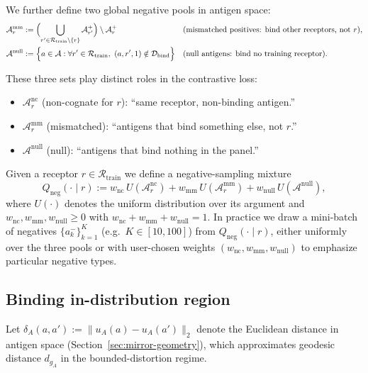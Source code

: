 \documentclass[11pt]{article}
\newcommand{\Dcal}{\mathcal{D}}
\newcommand{\Rcal}{\mathcal{R}}
\newcommand{\Acal}{\mathcal{A}}
\begin{document}
We further define two global negative pools in antigen space:
\begin{align*}
  \Acal_r^{\mathrm{mm}}
    &:= \Bigl( \bigcup_{r' \in \Rcal_{\mathrm{train}}\setminus\{r\}} \Acal_{r'}^+ \Bigr)
        \setminus \Acal_r^+ 
        &&\text{(mismatched positives: bind other receptors, not $r$)},\\
  \Acal^{\mathrm{null}}
    &:= \Bigl\{ a \in \Acal : \forall r' \in \Rcal_{\mathrm{train}},\ (a,r',1)\notin\Dcal_{\mathrm{bind}} \Bigr\}
        &&\text{(null antigens: bind no training receptor)}.
\end{align*}

These three sets play distinct roles in the contrastive loss:

\begin{itemize}
  \item $\Acal_r^{\mathrm{nc}}$ (non-cognate for $r$): “same receptor, non-binding antigen.”
  \item $\Acal_r^{\mathrm{mm}}$ (mismatched): “antigens that bind something else, not $r$.”
  \item $\Acal^{\mathrm{null}}$ (null): “antigens that bind nothing in the panel.”
\end{itemize}

Given a receptor $r\in\Rcal_{\mathrm{train}}$ we define a negative-sampling
mixture
\begin{equation}
  Q_{\mathrm{neg}}(\cdot \mid r)
    := w_{\mathrm{nc}}\, U(\Acal_r^{\mathrm{nc}})
     + w_{\mathrm{mm}}\, U(\Acal_r^{\mathrm{mm}})
     + w_{\mathrm{null}}\, U(\Acal^{\mathrm{null}}),
  \label{eq:Qneg}
\end{equation}
where $U(\cdot)$ denotes the uniform distribution over its argument and
$w_{\mathrm{nc}},w_{\mathrm{mm}},w_{\mathrm{null}}\ge 0$ with
$w_{\mathrm{nc}}+w_{\mathrm{mm}}+w_{\mathrm{null}}=1$. In practice we draw a
mini-batch of negatives $\{a_k^-\}_{k=1}^K$ (e.g.\ $K \in [10,100]$) from
$Q_{\mathrm{neg}}(\cdot\mid r)$, either uniformly over the three pools or with
user-chosen weights $(w_{\mathrm{nc}},w_{\mathrm{mm}},w_{\mathrm{null}})$ to emphasize
particular negative types.

\subsection{Binding in-distribution region}
\label{subsec:binding-indist}

Let $\delta_A(a,a') := \|u_A(a)-u_A(a')\|_2$ denote the Euclidean distance in
antigen space (Section~\ref{sec:mirror-geometry}), which approximates geodesic
distance $d_{g_A}$ in the bounded-distortion regime.
\end{document}
